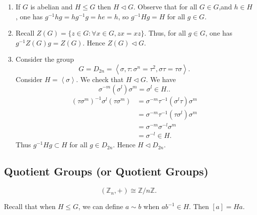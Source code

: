 \begin{example}
	\begin{enumerate}
		\item If $G$ is abelian and $H\le G$ then $H \triangleleft G$. Observe that for all $G \in G$,and $h \in H$, one has $g^{-1} hg=hg^{-1} g = he = h$, so $g^{-1} Hg = H$ for all $g \in G$.
		\item Recall $Z(G) = \{z \in G: \forall x \in G, z x = xz\} $. Thus, for all $g \in G$, one has $g^{-1} Z(G) g = Z(G)$. Hence $Z(G) \triangleleft G$.
		\item Consider the group
			\[
				G = D_{2n} = \left\langle \sigma, \tau: \sigma^n = \tau^2, \sigma\tau = \tau\sigma \right\rangle
			.\]
		Consider $H = \left\langle \sigma \right\rangle $. We check that $H\triangleleft G$. We have \[
			\sigma^{-m} (\sigma^{l})\sigma^{m}= \sigma^{l} \in H.
		.\] 
		\begin{align*}
			(\tau\sigma^m)^{-1}\sigma^l(\tau\sigma^m) &= \sigma^{-m}\tau^{-1} \left( \sigma^l \tau \right)  \sigma^{m}\\
			 &= \sigma^{-m}\tau^{-1} \left( \tau \sigma^l \right)  \sigma^{m}\\
			 &= \sigma^{-m}\sigma^{-l}\sigma^m \\
			 &= \sigma^{-l} \in H 
		.\end{align*} 
		Thus $g^{-1} H g \subset H$ for all $g \in D_{2n}$. Hence $H \triangleleft D_{2n}$.
	\end{enumerate}
\end{example} 


\subsection{Quotient Groups (or Quotient Groups)}

\[
	(\mathbb{Z}_n, +) \cong \mathbb{Z} / n \mathbb{Z}
.\] 

Recall that when $H \le G$, we can define $a\sim b$ when $ab^{-1} \in H$. Then $[a] = Ha$. 


